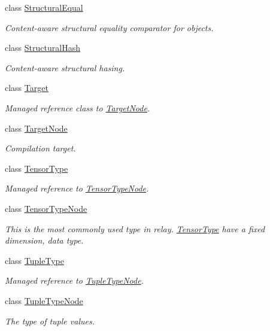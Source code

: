\begin{DoxyCompactItemize}
class \hyperlink{classtvm_1_1StructuralEqual}{Structural\+Equal}
\begin{DoxyCompactList}\small\item\em Content-\/aware structural equality comparator for objects. \end{DoxyCompactList}\item 
class \hyperlink{classtvm_1_1StructuralHash}{Structural\+Hash}
\begin{DoxyCompactList}\small\item\em Content-\/aware structural hasing. \end{DoxyCompactList}\item 
class \hyperlink{classtvm_1_1Target}{Target}
\begin{DoxyCompactList}\small\item\em Managed reference class to \hyperlink{classtvm_1_1TargetNode}{Target\+Node}. \end{DoxyCompactList}\item 
class \hyperlink{classtvm_1_1TargetNode}{Target\+Node}
\begin{DoxyCompactList}\small\item\em Compilation target. \end{DoxyCompactList}\item 
class \hyperlink{classtvm_1_1TensorType}{Tensor\+Type}
\begin{DoxyCompactList}\small\item\em Managed reference to \hyperlink{classtvm_1_1TensorTypeNode}{Tensor\+Type\+Node}. \end{DoxyCompactList}\item 
class \hyperlink{classtvm_1_1TensorTypeNode}{Tensor\+Type\+Node}
\begin{DoxyCompactList}\small\item\em This is the most commonly used type in relay. \hyperlink{classtvm_1_1TensorType}{Tensor\+Type} have a fixed dimension, data type. \end{DoxyCompactList}\item 
class \hyperlink{classtvm_1_1TupleType}{Tuple\+Type}
\begin{DoxyCompactList}\small\item\em Managed reference to \hyperlink{classtvm_1_1TupleTypeNode}{Tuple\+Type\+Node}. \end{DoxyCompactList}\item 
class \hyperlink{classtvm_1_1TupleTypeNode}{Tuple\+Type\+Node}
\begin{DoxyCompactList}\small\item\em The type of tuple values. \end{DoxyCompactList}\item 

\end{DoxyCompactItemize}
